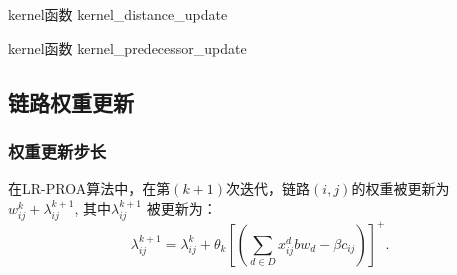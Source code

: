 \begin{algorithm}[t]
\begin{algorithmic}[1]
\EndIf
\Return
\EndFunction
\end{algorithmic}
\caption{kernel函数 kernel\_distance\_update}
\label{KernelDist}
\end{algorithm}

\begin{algorithm}[t]
\begin{algorithmic}[1]
\EndIf
\Return
\EndFunction
\end{algorithmic}
\caption{kernel函数 kernel\_predecessor\_update}
\label{KernelPre}
\end{algorithm}
\subsection{链路权重更新}
\subsubsection{权重更新步长}
  
在LR-PROA算法中，在第$(k+1)$次迭代，链路$(i,j)$的权重被更新为$w_{ij}^{k} + \lambda_{ij}^{k+1}$, 其中$\lambda_{ij}^{k+1}$ 被更新为：
\begin{equation}\label{Iter}
  \lambda_{ij}^{k+1} = \lambda_{ij}^k + \theta_k[(\sum\limits_{d \in D}x_{ij}^dbw_d - \beta c_{ij})]^+.
\end{equation}
  
